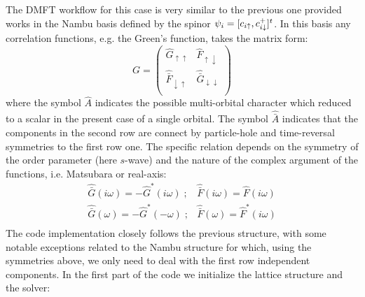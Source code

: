 The DMFT workflow for this case is very similar to the previous one
provided works in the Nambu basis defined by the spinor
$\psi_i=[c_{i\uparrow}, c^+_{i\downarrow}]^t$.
In this basis any correlation functions, e.g. the Green's function, takes the matrix form:
\begin{equation}
  G =
  \begin{pmatrix}
    \hat{G}_{\uparrow\uparrow} & \hat{F}_{\uparrow\downarrow}\\
    \hat{\bar{F}}_{\downarrow\uparrow}  &    \hat{\bar{G}}_{\downarrow\downarrow} \\
   \end{pmatrix}
\end{equation}
where the symbol $\hat{A}$ indicates the possible multi-orbital
character which reduced to a scalar in the present case of a single
orbital. The symbol $\hat{\bar{A}}$ indicates that the components in
the second row are connect by particle-hole and time-reversal
symmetries to the first row one. The specific relation depends on the
symmetry of the order parameter (here $s$-wave) and the nature of the
complex argument of the functions, i.e. Matsubara or real-axis:
\begin{equation}
\begin{array}{cc}
  \hat{\bar{G}}(i\omega) = -\hat{G}^*(i\omega)\;; &  \hat{\bar{F}}(i\omega) = \hat{F}(i\omega)\\
  \hat{\bar{G}}(\omega)  = -\hat{G}^*(-\omega) \;; & \hat{\bar{F}}(\omega) = \hat{F}^*(i\omega)\\
\end{array}
\end{equation}  
The code implementation closely follows the previous structure, with
some notable exceptions related to the Nambu structure for which,
using the symmetries above, we only need to deal with the first row
independent components. In the first part of the code we initialize
the lattice structure and the solver:
